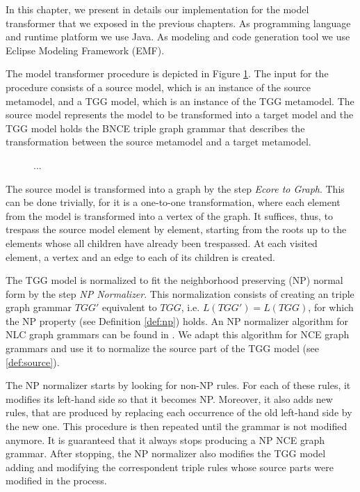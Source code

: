 In this chapter, we present in details our implementation for the model transformer that we exposed in the previous chapters. As programming language and runtime platform we use Java. As modeling and code generation tool we use Eclipse Modeling Framework (EMF).


The model transformer procedure is depicted in Figure \ref{fig:implementation-scheme}. The input for the procedure consists of a source model, which is an instance of the source metamodel, and a TGG model, which is an instance of the TGG metamodel. The source model represents the model to be transformed into a target model and the TGG model holds the BNCE triple graph grammar that describes the transformation between the source metamodel and a target metamodel.

\begin{figure}[h]
	
	\caption{...}
	\label{fig:implementation-scheme}
\end{figure}

The source model is transformed into a graph by the step \textit{Ecore to Graph}. This can be done trivially, for it is a one-to-one transformation, where each element from the model is transformed into a vertex of the graph. It suffices, thus, to trespass the source model element by element, starting from the roots up to the elements whose all children have already been trespassed. At each visited element, a vertex and an edge to each of its children is created.

The TGG model is normalized to fit the neighborhood preserving (NP) normal form by the step \textit{NP Normalizer}. This normalization consists of creating an triple graph grammar $TGG'$ equivalent to $TGG$, i.e. $L(TGG') = L(TGG)$, for which the NP property (see Definition \ref{def:np}) holds. An NP normalizer algorithm for NLC graph grammars can be found in \citep{rozenberg1986boundary}. We adapt this algorithm for NCE graph grammars and use it to normalize the source part of the TGG model (see \ref{def:source}).

The NP normalizer starts by looking for non-NP rules. For each of these rules, it modifies its left-hand side so that it becomes NP. Moreover, it also adds new rules, that are produced by replacing each occurrence of the old left-hand side by the new one. This procedure is then repeated until the grammar is not modified anymore. It is guaranteed that it always stops producing a NP NCE graph grammar. After stopping, the NP normalizer also modifies the TGG model adding and modifying the correspondent triple rules whose source parts were modified in the process.

